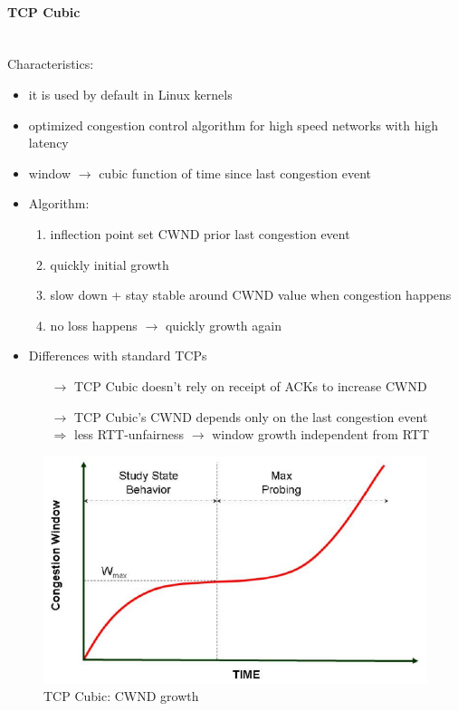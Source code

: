 \paragraph{TCP Cubic}\mbox{}\\[0.2cm]
Characteristics:
\begin{itemize}
    \item it is used by default in Linux kernels
    \item optimized congestion control algorithm for high speed networks with high latency
    \item window $\rightarrow$ cubic function of time since last congestion event
    \item Algorithm:
    \begin{enumerate}
        \item inflection point set CWND prior last congestion event
        \item quickly initial growth
        \item slow down + stay stable around CWND value when congestion happens
        \item no loss happens $\rightarrow$ quickly growth again
    \end{enumerate}
    \item Differences with standard TCPs
    \begin{itemize}
        \item[$\rightarrow$] TCP Cubic doesn't rely on receipt of ACKs to increase CWND
        \item[$\rightarrow$] TCP Cubic's CWND depends only on the last congestion event\\
        $\Rightarrow$ less RTT-unfairness $\rightarrow$ window growth independent from RTT
    \end{itemize}
\end{itemize}
\begin{figure}[!h] 
    \centering 
    \includegraphics[scale = 0.4]{images/cwnd-growth-tcp-cubic.png} 
    \caption{TCP Cubic: CWND growth}
    \label{cwnd-growth-tcp-cubic}
\end{figure}